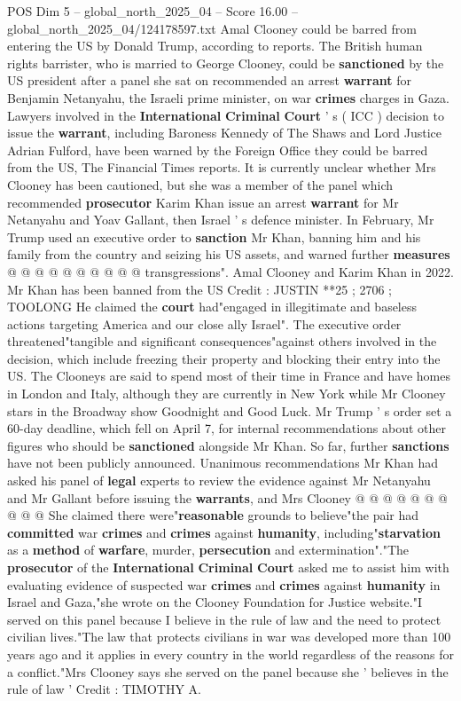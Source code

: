 \begin{textsample}{POS Dim 5 – global\_north\_2025\_04 – Score 16.00 – global\_north\_2025\_04/124178597.txt}  \label{ex:f5_pos_107}
Amal Clooney could be barred from entering the US by Donald Trump, according to reports.
The British human rights barrister, who is married to George Clooney, could be \textbf{sanctioned} by the US president after a panel she sat on recommended an arrest \textbf{warrant} for Benjamin Netanyahu, the Israeli prime minister, on war \textbf{crimes} charges in Gaza.
Lawyers involved in the \textbf{International} \textbf{Criminal} \textbf{Court} ' s ( ICC ) decision to issue the \textbf{warrant}, including Baroness Kennedy of The Shaws and Lord Justice Adrian Fulford, have been warned by the Foreign Office they could be barred from the US, The Financial Times reports.
It is currently unclear whether Mrs Clooney has been cautioned, but she was a member of the panel which recommended \textbf{prosecutor} Karim Khan issue an arrest \textbf{warrant} for Mr Netanyahu and Yoav Gallant, then Israel ' s defence minister.
In February, Mr Trump used an executive order to \textbf{sanction} Mr Khan, banning him and his family from the country and seizing his US assets, and warned further \textbf{measures} @ @ @ @ @ @ @ @ @ @ transgressions".
Amal Clooney and Karim Khan in 2022.
Mr Khan has been banned from the US Credit : JUSTIN **25 ; 2706 ; TOOLONG He claimed the \textbf{court} had"engaged in illegitimate and baseless actions targeting America and our close ally Israel".
The executive order threatened"tangible and significant consequences"against others involved in the decision, which include freezing their property and blocking their entry into the US.
The Clooneys are said to spend most of their time in France and have homes in London and Italy, although they are currently in New York while Mr Clooney stars in the Broadway show Goodnight and Good Luck.
Mr Trump ' s order set a 60-day deadline, which fell on April 7, for internal recommendations about other figures who should be \textbf{sanctioned} alongside Mr Khan.
So far, further \textbf{sanctions} have not been publicly announced.
Unanimous recommendations Mr Khan had asked his panel of \textbf{legal} experts to review the evidence against Mr Netanyahu and Mr Gallant before issuing the \textbf{warrants}, and Mrs Clooney @ @ @ @ @ @ @ @ @ @ She claimed there were"\textbf{reasonable} grounds to believe"the pair had \textbf{committed} war \textbf{crimes} and \textbf{crimes} against \textbf{humanity}, including"\textbf{starvation} as a \textbf{method} of \textbf{warfare}, murder, \textbf{persecution} and extermination"."The \textbf{prosecutor} of the \textbf{International} \textbf{Criminal} \textbf{Court} asked me to assist him with evaluating evidence of suspected war \textbf{crimes} and \textbf{crimes} against \textbf{humanity} in Israel and Gaza,"she wrote on the Clooney Foundation for Justice website."I served on this panel because I believe in the rule of law and the need to protect civilian lives."The law that protects civilians in war was developed more than 100 years ago and it applies in every country in the world regardless of the reasons for a conflict."Mrs Clooney says she served on the panel because she ' believes in the rule of law ' Credit : TIMOTHY A.

\end{textsample}
